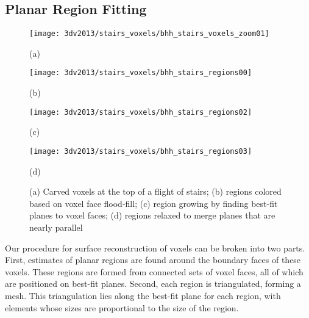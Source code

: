 \documentclass[12pt,onecolumn,oneside]{book}
\begin{document}
\subsection{Planar Region Fitting}
\label{ssec:voxel_region_fitting}

\begin{figure}[t]

	\begin{minipage}[b]{0.45\linewidth}
	\centerline{\texttt{[image: 3dv2013/stairs\_voxels/bhh\_stairs\_voxels\_zoom01]}}
	\centerline{(a)}\medskip
	\end{minipage}
	\hfill
	\begin{minipage}[b]{0.45\linewidth}
	\centerline{\texttt{[image: 3dv2013/stairs\_voxels/bhh\_stairs\_regions00]}}
	\centerline{(b)}\medskip
	\end{minipage}
	\begin{minipage}[b]{0.45\linewidth}
	\centerline{\texttt{[image: 3dv2013/stairs\_voxels/bhh\_stairs\_regions02]}}
	\centerline{(c)}\medskip
	\end{minipage}
	\hfill
	\begin{minipage}[b]{0.45\linewidth}
	\centerline{\texttt{[image: 3dv2013/stairs\_voxels/bhh\_stairs\_regions03]}}
	\centerline{(d)}\medskip
	\end{minipage}

	\caption[Method of region fitting to voxel carving.]{(a) Carved voxels at the top of a flight of stairs; (b) regions colored based on voxel face flood-fill; (c) region growing by finding best-fit planes to voxel faces; (d) regions relaxed to merge planes that are nearly parallel}
	\label{fig:stairs_voxels}
\end{figure}

Our procedure for surface reconstruction of voxels can be broken into two parts.  First, estimates of planar regions are found around the boundary faces of these voxels.  These regions are formed from connected sets of voxel faces, all of which are positioned on best-fit planes.  Second, each region is triangulated, forming a mesh.  This triangulation lies along the best-fit plane for each region, with elements whose sizes are proportional to the size of the region.

\end{document}
